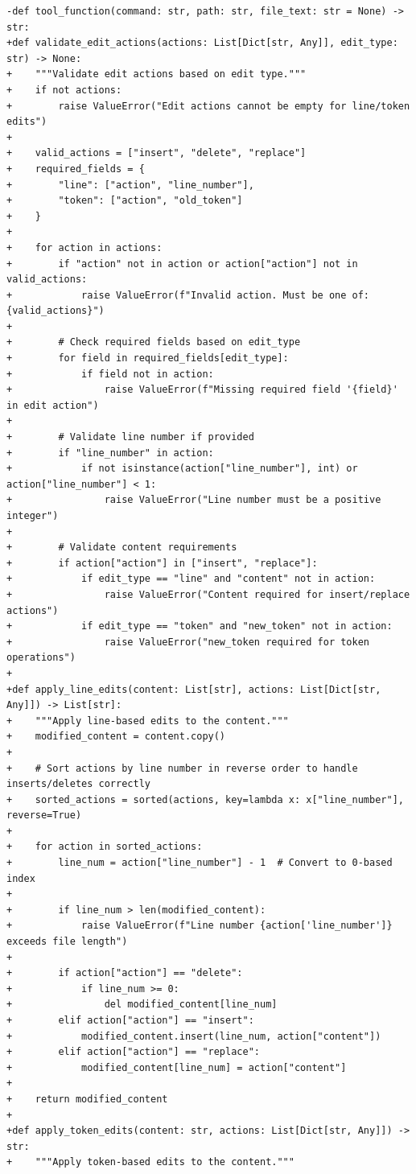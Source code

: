 \documentclass{article}
\begin{document}
\begin{lstlisting}[style=diffstyle]
-def tool_function(command: str, path: str, file_text: str = None) -> str:
+def validate_edit_actions(actions: List[Dict[str, Any]], edit_type: str) -> None:
+    """Validate edit actions based on edit type."""
+    if not actions:
+        raise ValueError("Edit actions cannot be empty for line/token edits")
+
+    valid_actions = ["insert", "delete", "replace"]
+    required_fields = {
+        "line": ["action", "line_number"],
+        "token": ["action", "old_token"]
+    }
+
+    for action in actions:
+        if "action" not in action or action["action"] not in valid_actions:
+            raise ValueError(f"Invalid action. Must be one of: {valid_actions}")
+
+        # Check required fields based on edit_type
+        for field in required_fields[edit_type]:
+            if field not in action:
+                raise ValueError(f"Missing required field '{field}' in edit action")
+
+        # Validate line number if provided
+        if "line_number" in action:
+            if not isinstance(action["line_number"], int) or action["line_number"] < 1:
+                raise ValueError("Line number must be a positive integer")
+
+        # Validate content requirements
+        if action["action"] in ["insert", "replace"]:
+            if edit_type == "line" and "content" not in action:
+                raise ValueError("Content required for insert/replace actions")
+            if edit_type == "token" and "new_token" not in action:
+                raise ValueError("new_token required for token operations")
+
+def apply_line_edits(content: List[str], actions: List[Dict[str, Any]]) -> List[str]:
+    """Apply line-based edits to the content."""
+    modified_content = content.copy()
+    
+    # Sort actions by line number in reverse order to handle inserts/deletes correctly
+    sorted_actions = sorted(actions, key=lambda x: x["line_number"], reverse=True)
+
+    for action in sorted_actions:
+        line_num = action["line_number"] - 1  # Convert to 0-based index
+        
+        if line_num > len(modified_content):
+            raise ValueError(f"Line number {action['line_number']} exceeds file length")
+
+        if action["action"] == "delete":
+            if line_num >= 0:
+                del modified_content[line_num]
+        elif action["action"] == "insert":
+            modified_content.insert(line_num, action["content"])
+        elif action["action"] == "replace":
+            modified_content[line_num] = action["content"]
+
+    return modified_content
+
+def apply_token_edits(content: str, actions: List[Dict[str, Any]]) -> str:
+    """Apply token-based edits to the content."""

\end{lstlisting}
\end{document}
